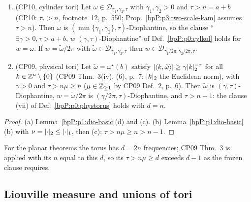 \begin{lemma}\label{bpP:p1:dio-sources}\label{bpP:p1:diophantine-convert}
\begin{enumerate}[label=(\alph*)]
\item \textup{(CP10, cylinder tori)} Let $\omega\in\mathcal D_{\gamma_1,\gamma_2,\tau}$ with $\gamma_1,\gamma_2>0$ and $\tau>n=a+b$ (CP10: $\tau_*>n$, footnote~12, p.~550; Prop.~\ref{bpP:p3:two-scale-kam} assumes $\tau>n$). Then $\omega$ is $(\min\{\gamma_1,\gamma_2\},\tau)$-Diophantine, so the clause ``$\exists\gamma>0,\tau>a+b$, $w$ $(\gamma,\tau)$-Diophantine'' of Def.~\ref{bpP:p0:cylkol} holds for $w=\omega$. If $w=\tilde\omega/2\pi$ with $\tilde\omega\in\mathcal D_{\tilde\gamma_1,\tilde\gamma_2,\tau}$ then $w\in\mathcal D_{\tilde\gamma_1/2\pi,\tilde\gamma_2/2\pi,\tau}$.
\item \textup{(CP09, physical tori)} Let $\tilde\omega=\omega^\star(b)$ satisfy $\lvert \langle k,\tilde\omega\rangle\rvert\ge\gamma\lvert k\rvert_2^{-\tau}$ for all $k\in\mathbb{Z}^n\setminus\{0\}$ (CP09 Thm.~3(iv), (6), p.~7: $\lvert k\rvert_2$ the Euclidean norm), with $\gamma>0$ and $\tau>n\mu\ge n$ ($\mu\in\mathbb{Z}_{\ge1}$ by CP09 Def.~2, p.~6). Then $\tilde\omega$ is $(\gamma,\tau)$-Diophantine, $w=\tilde\omega/2\pi$ is $(\gamma/2\pi,\tau)$-Diophantine, and $\tau>n-1$: the clause (vii) of Def.~\ref{bpP:p0:phystorus} holds with $d=n$.
\end{enumerate}
\end{lemma}
\begin{proof}
(a) Lemma~\ref{bpP:p1:dio-basic}(d) and (c). (b) Lemma~\ref{bpP:p1:dio-basic}(b) with $\nu=\lvert \cdot\rvert_2\le\lvert \cdot\rvert_1$, then (c); $\tau>n\mu\ge n>n-1$.
\end{proof}
\begin{remark}[Dimension]\label{bpP:p1:dio-d}
For the planar theorems the torus has $d=2n$ frequencies; CP09 Thm.~3 is applied with its $n$ equal to this $d$, so its $\tau>n\mu\ge d$ exceeds $d-1$ as the frozen clause requires.
\end{remark}

\subsection{Liouville measure and unions of tori}\label{bpP:p1:measure}

